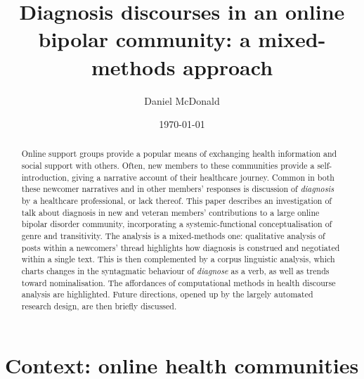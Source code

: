 \documentclass{article}
\author{Daniel McDonald}
\date{\today}
\title{Diagnosis discourses in an online bipolar community: a mixed-methods approach}
\begin{document}
	\maketitle


\begin{abstract}
	Online support groups provide a popular means of exchanging health information and social support with others. Often, new members to these communities provide a self-introduction, giving a narrative account of their healthcare journey. Common in both these newcomer narratives and in other members' responses is discussion of \emph{diagnosis} by a healthcare professional, or lack thereof. This paper describes an investigation of talk about diagnosis in new and veteran members' contributions to a large online bipolar disorder community, incorporating a systemic-functional conceptualisation of genre and transitivity. The analysis is a mixed-methods one: qualitative analysis of posts within a newcomers' thread highlights how diagnosis is construed and negotiated within a single text. This is then complemented by a corpus linguistic analysis, which charts changes in the syntagmatic behaviour of \emph{diagnose} as a verb, as well as trends toward nominalisation. The affordances of computational methods in health discourse analysis are highlighted. Future directions, opened up by the largely automated research design, are then briefly discussed.
	\end{abstract}

\section{Context: online health communities}
\end{document}
